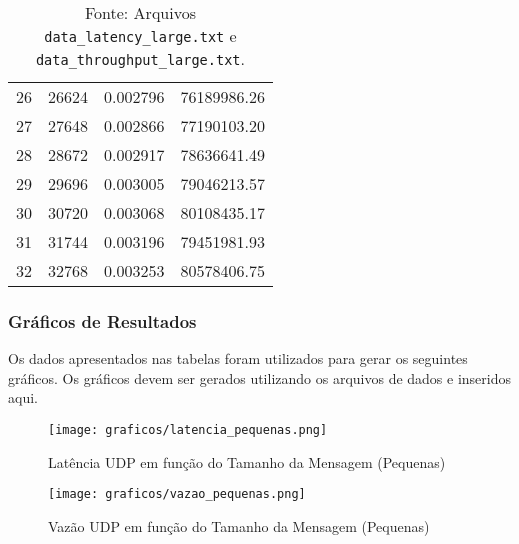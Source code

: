 \begin{table}[H]
{\begin{tabular}{rrrr}
        26 & 26624 & 0.002796 & 76189986.26 \\
        27 & 27648 & 0.002866 & 77190103.20 \\
        28 & 28672 & 0.002917 & 78636641.49 \\
        29 & 29696 & 0.003005 & 79046213.57 \\
        30 & 30720 & 0.003068 & 80108435.17 \\
        31 & 31744 & 0.003196 & 79451981.93 \\
        32 & 32768 & 0.003253 & 80578406.75 \\
        \bottomrule
    \end{tabular}
    }
    \caption*{Fonte: Arquivos \texttt{data\_latency\_large.txt} e \texttt{data\_throughput\_large.txt}.}
\end{table}

\subsubsection{Gráficos de Resultados}
Os dados apresentados nas tabelas foram utilizados para gerar os seguintes gráficos. Os gráficos devem ser gerados utilizando os arquivos de dados e inseridos aqui.

\begin{figure}[H] %
    \centering
    \texttt{[image: graficos/latencia\_pequenas.png]}
    \caption{Latência UDP em função do Tamanho da Mensagem (Pequenas)}
    \label{fig:latencia_pequenas}
\end{figure}

\begin{figure}[H] %
    \centering
    \texttt{[image: graficos/vazao\_pequenas.png]}
    \caption{Vazão UDP em função do Tamanho da Mensagem (Pequenas)}
    \label{fig:vazao_pequenas}
\end{figure}

